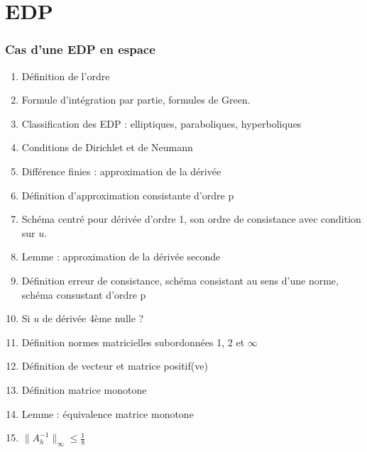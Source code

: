 \documentclass[11pt, twocolumn, landscape]{article}
\begin{document}
\part{EDP}
\section{Cas d'une EDP en espace}
\begin{enumerate}
\item Définition de l'ordre
\item Formule d'intégration par partie, formules de Green.
\item Classification des EDP : elliptiques, paraboliques, hyperboliques
\item Conditions de Dirichlet et de Neumann
\item Différence finies : approximation de la dérivée
\item Définition d'approximation consistante d'ordre p
\item Schéma centré pour dérivée d'ordre 1, son ordre de consistance avec condition sur $u$.
\item Lemme : approximation de la dérivée seconde
\item Définition erreur de consistance, schéma consistant au sens d'une norme, schéma consustant d'ordre p
\item Si $u$ de dérivée 4ème nulle ?
\item Définition normes matricielles subordonnées 1, 2 et $\infty$
\item Définition de vecteur et matrice positif(ve)
\item Définition matrice monotone
\item Lemme : équivalence matrice monotone
\item \bf{$\|A_h^{-1}\|_{\infty}\leq \frac{1}{8}$}
\end{enumerate}
\end{document}
